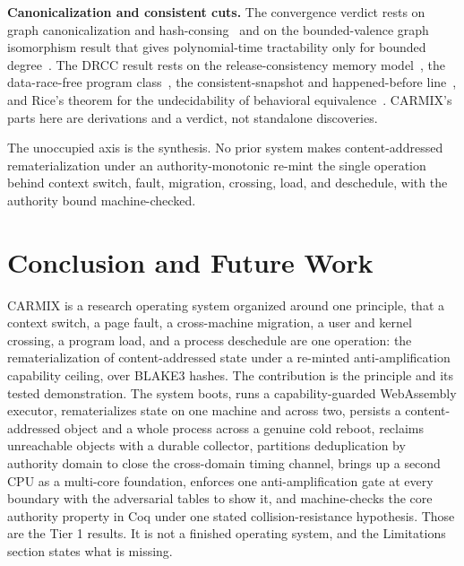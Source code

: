 \documentclass[10pt,twocolumn]{article}
\newcommand{\carmix}{CARMIX}
\begin{document}
\textbf{Canonicalization and consistent cuts.} The convergence verdict rests on
graph canonicalization and hash-consing~\cite{filliatre2006hashconsing} and on the
bounded-valence graph isomorphism result that gives polynomial-time tractability
only for bounded degree~\cite{luks1982valence,babai2016gi}. The DRCC result rests
on the release-consistency memory model~\cite{gharachorloo1990rc}, the
data-race-free program class~\cite{adve1990wo}, the consistent-snapshot and
happened-before line~\cite{chandy1985snapshots,lamport1978clocks}, and Rice's
theorem for the undecidability of behavioral equivalence~\cite{rice1953}.
\carmix{}'s parts here are derivations and a verdict, not standalone discoveries.

The unoccupied axis is the synthesis. No prior system makes content-addressed
rematerialization under an authority-monotonic re-mint the single operation behind
context switch, fault, migration, crossing, load, and deschedule, with the
authority bound machine-checked.

\section{Conclusion and Future Work}

\carmix{} is a research operating system organized around one principle, that a
context switch, a page fault, a cross-machine migration, a user and kernel
crossing, a program load, and a process deschedule are one operation: the
rematerialization of content-addressed state under a re-minted anti-amplification
capability ceiling, over BLAKE3 hashes. The contribution is the principle and its
tested demonstration. The system boots, runs a capability-guarded WebAssembly
executor, rematerializes state on one machine and across two, persists a
content-addressed object and a whole process across a genuine cold reboot,
reclaims unreachable objects with a durable collector, partitions deduplication by
authority domain to close the cross-domain timing channel, brings up a second CPU
as a multi-core foundation, enforces one anti-amplification gate at every boundary
with the adversarial tables to show it, and machine-checks the core authority
property in Coq under one stated collision-resistance hypothesis. Those are the
Tier 1 results. It is not a finished operating system, and the Limitations section
states what is missing.
\end{document}
